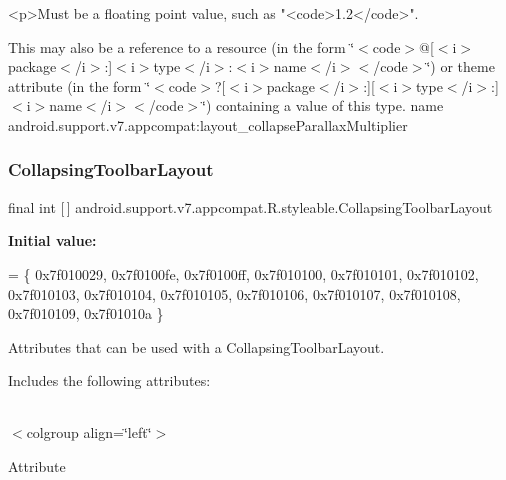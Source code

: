 \begin{DoxyVerb}      <p>Must be a floating point value, such as "<code>1.2</code>".
\end{DoxyVerb}
 

This may also be a reference to a resource (in the form \char`\"{}$<$code$>$@\mbox{[}$<$i$>$package$<$/i$>$\+:\mbox{]}$<$i$>$type$<$/i$>$\+:$<$i$>$name$<$/i$>$$<$/code$>$\char`\"{}) or theme attribute (in the form \char`\"{}$<$code$>$?\mbox{[}$<$i$>$package$<$/i$>$\+:\mbox{]}\mbox{[}$<$i$>$type$<$/i$>$\+:\mbox{]}$<$i$>$name$<$/i$>$$<$/code$>$\char`\"{}) containing a value of this type.  name android.\+support.\+v7.\+appcompat\+:layout\+\_\+collapse\+Parallax\+Multiplier \mbox{\label{classandroid_1_1support_1_1v7_1_1appcompat_1_1R_1_1styleable_a8d282d917f35e5a08dd37db243410383}} 
\subsubsection{\texorpdfstring{Collapsing\+Toolbar\+Layout}{CollapsingToolbarLayout}}
{\footnotesize\ttfamily final int \mbox{[}$\,$\mbox{]} android.\+support.\+v7.\+appcompat.\+R.\+styleable.\+Collapsing\+Toolbar\+Layout\hspace{0.3cm}{\ttfamily [static]}}

{\bfseries Initial value\+:}
\begin{DoxyCode}
= \{
            0x7f010029, 0x7f0100fe, 0x7f0100ff, 0x7f010100,
            0x7f010101, 0x7f010102, 0x7f010103, 0x7f010104,
            0x7f010105, 0x7f010106, 0x7f010107, 0x7f010108,
            0x7f010109, 0x7f01010a
        \}
\end{DoxyCode}
Attributes that can be used with a Collapsing\+Toolbar\+Layout. 

Includes the following attributes\+:

\tabulinesep=1mm
\begin{longtabu} spread 0pt [c]{*{0}{|X[-1]}|}
\hline
\end{longtabu}
$<$colgroup align=\char`\"{}left\char`\"{}$>$ 

Attribute

